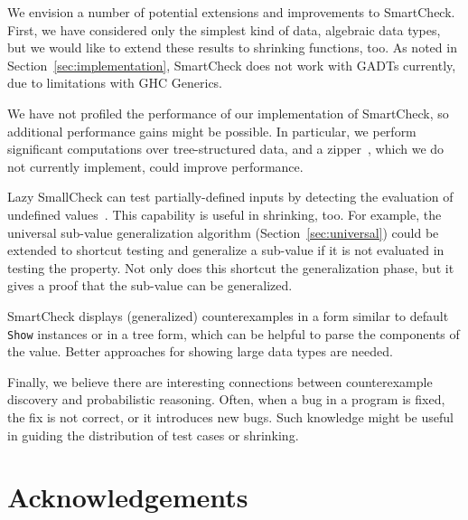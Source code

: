 \documentclass{sigplanconf}
\newcommand{\ttp}[1]{\texttt{#1}}
\begin{document}
We envision a number of potential extensions and improvements to SmartCheck.
First, we have considered only the simplest kind of data, algebraic data types,
but we would like to extend these results to shrinking functions, too.  As noted
in Section~\ref{sec:implementation}, SmartCheck does not work with GADTs
currently, due to limitations with GHC Generics.

We have not profiled the performance of our implementation of SmartCheck, so
additional performance gains might be possible.  In particular, we perform
significant computations over tree-structured data, and a zipper~\cite{zipper},
which we do not currently implement, could improve performance.

Lazy SmallCheck can test partially-defined inputs by detecting the evaluation of
undefined values~\cite{sc}.  This capability is useful in shrinking, too.  For
example, the universal sub-value generalization algorithm
(Section~\ref{sec:universal}) could be extended to shortcut testing and
generalize a sub-value if it is not evaluated in testing the property.  Not only
does this shortcut the generalization phase, but it gives a proof that the
sub-value can be generalized.

SmartCheck displays (generalized) counterexamples in a form similar to default
\ttp{Show} instances or in a tree form, which can be helpful to parse the
components of the value.  Better approaches for showing large data types are
needed.

Finally, we believe there are interesting connections between counterexample
discovery and probabilistic reasoning.  Often, when a bug in a program is fixed,
the fix is not correct, or it introduces new bugs.  Such knowledge might be
useful in guiding the distribution of test cases or shrinking.


\section*{Acknowledgements}




\end{document}
